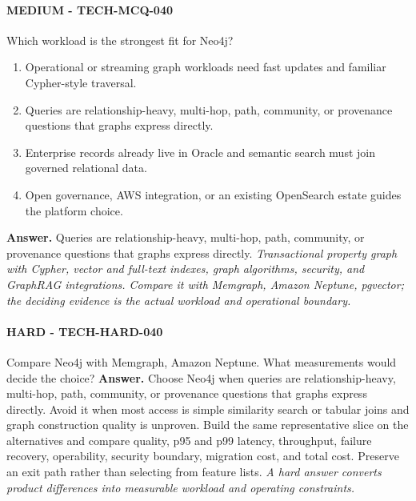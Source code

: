 \paragraph{MEDIUM - TECH-MCQ-040} Which workload is the strongest fit for Neo4j?
\begin{enumerate}[label=\Alph*.]
\item Operational or streaming graph workloads need fast updates and familiar Cypher-style traversal.
\item Queries are relationship-heavy, multi-hop, path, community, or provenance questions that graphs express directly.
\item Enterprise records already live in Oracle and semantic search must join governed relational data.
\item Open governance, AWS integration, or an existing OpenSearch estate guides the platform choice.
\end{enumerate}
\textbf{Answer.} Queries are relationship-heavy, multi-hop, path, community, or provenance questions that graphs express directly.
\textit{Transactional property graph with Cypher, vector and full-text indexes, graph algorithms, security, and GraphRAG integrations. Compare it with Memgraph, Amazon Neptune, pgvector; the deciding evidence is the actual workload and operational boundary.}
\paragraph{HARD - TECH-HARD-040} Compare Neo4j with Memgraph, Amazon Neptune. What measurements would decide the choice?
\textbf{Answer.} Choose Neo4j when queries are relationship-heavy, multi-hop, path, community, or provenance questions that graphs express directly. Avoid it when most access is simple similarity search or tabular joins and graph construction quality is unproven. Build the same representative slice on the alternatives and compare quality, p95 and p99 latency, throughput, failure recovery, operability, security boundary, migration cost, and total cost. Preserve an exit path rather than selecting from feature lists.
\textit{A hard answer converts product differences into measurable workload and operating constraints.}

